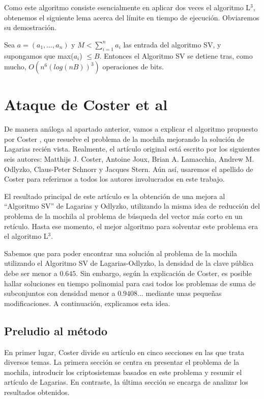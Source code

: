     Como este algoritmo consiste esencialmente en aplicar dos veces el algoritmo L$^{3}$, obtenemos el siguiente lema acerca del límite en tiempo de ejecución. Obviaremos su demostración.

    \begin{lema} \cite{artLagOdl}
        Sea $a = (a_{1}, ... , a_{n})$ y $M < \sum_{i=1}^{n} a_{i}$ las entrada del algoritmo SV, y supongamos que max($a_{i}$) $\leq B$. Entonces el Algoritmo SV se detiene tras, como mucho, $O(n^{6}(log (nB))^{3})$ operaciones de bits.
    \end{lema}
    
    \section{Ataque de Coster et al}

    De manera análoga al apartado anterior, vamos a explicar el algoritmo propuesto por Coster \cite{artCoster}, que resuelve el problema de la mochila mejorando la solución de Lagarias recién vista. Realmente, el artículo original está escrito por los siguientes seis autores: Matthijs J. Coster, Antoine Joux, Brian A. Lamacchia, Andrew M. Odlyzko, Claus-Peter Schnorr y Jacques Stern. Aún así, usaremos el apellido de Coster para referirnos a todos los autores involucrados en este trabajo.

    El resultado principal de este artículo es la obtención de una mejora al ``Algoritmo SV'' de Lagarias y Odlyzko, utilizando la misma idea de reducción del problema de la mochila al problema de búsqueda del vector más corto en un retículo. Hasta ese momento, el mejor algoritmo para solventar este problema era el algoritmo L$^{3}$.

    Sabemos que para poder encontrar una solución al problema de la mochila utilizando el Algoritmo SV de Lagarias-Odlyzko, la densidad de la clave pública debe ser menor a $0.645$. Sin embargo, según la explicación de Coster, es posible hallar soluciones en tiempo polinomial para casi todos los problemas de suma de subconjuntos con densidad menor a $0.9408...$ mediante unas pequeñas modificaciones. A continuación, explicamos esta idea.

    \subsection{Preludio al método}

    En primer lugar, Coster divide su artículo en cinco secciones en las que trata diversos temas. La primera sección se centra en presentar el problema de la mochila, introducir los criptosistemas basados en este problema y resumir el artículo de Lagarias. En contraste, la última sección se encarga de analizar los resultados obtenidos. 
    
